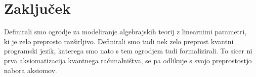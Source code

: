 \section{Zaključek}

Definirali smo ogrodje za modeliranje algebrajskih teorij z linearnimi parametri,
ki je zelo preprosto razširljivo.
Definirali smo tudi nek zelo preprost kvantni programski jezik, katerega smo nato s tem ogrodjem tudi formalizirali.
To sicer ni prva aksiomatizacija kvantnega računalništva, se pa odlikuje s svojo preprostostjo nabora aksiomov.
